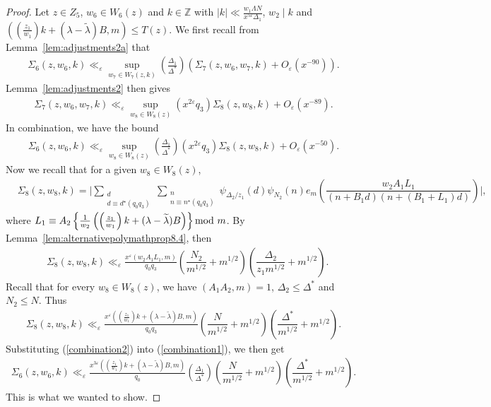 \documentclass{amsart}
\numberwithin{equation}{section}
\begin{document}
\begin{proof} 
Let $z \in Z_5$, $w_6 \in W_6(z)$ and $k \in \mathbb{Z}$ with   $|k| \ll  \frac{w_1\Lambda N}{x^{5\varepsilon}\Delta_1}$,   
 $w_2 \mid k$  and $((\frac{z_1}{w_1})k+(\lambda-\widetilde{\lambda})B,m) \leq T(z)$. We first recall from Lemma~\ref{lem:adjustments2a} that 
\begin{align*}
 \Sigma_6(z,w_6,k) \ll_\varepsilon \sup_{w_7 \in W_7(z,k)} \left( \frac{\Delta_1}{\Delta^*}\right) (\Sigma_7(z,w_6,w_7,k) + O_\varepsilon(x^{-90})).
\end{align*} 
Lemma~\ref{lem:adjustments2} then gives 
 \begin{align*}
 \Sigma_7(z,w_6,w_7, k) \ll_\varepsilon \sup_{w_8 \in W_8(z)} \left( x^{2\varepsilon} q_3 \right) \Sigma_8(z,w_8,k) + O_\varepsilon(x^{-89}).
 \end{align*}
 In combination, we have  the bound
 \begin{align} \label{combination1}
 \Sigma_6(z,w_6,k) \ll_\varepsilon \sup_{w_8 \in W_8(z)} \left( \frac{\Delta_1}{\Delta^*}\right) \left( x^{2\varepsilon} q_3 \right) \Sigma_8(z,w_8,k) + O_\varepsilon(x^{-50}).
\end{align} 
Now we recall that for a given $w_8 \in W_8(z)$, 
 \begin{align*}
&\Sigma_8(z,w_8,k) =  \Bigg| \sum_{\substack{d \\  d \equiv d^\star  (q_0q_3) }} \sum_{\substack{n \\   n \equiv n^\star  (q_0q_3)    }}  \psi_{\Delta_2/z_1}(d)\psi_{N_2}(n)  e_{m}\left(\dfrac{w_2A_1L_1}{( n+B_1 d)(  n+(B_1+L_1)d)}\right)\Bigg|,
\end{align*}  
where $
L_1 \equiv  A_2 \left\{\frac{1}{w_2}\left(\left(\frac{z_1}{w_1}\right)k + (\lambda-\widetilde{\lambda})B\right)\right\} \mbox{\rm mod } m$. By Lemma~\ref{lem:alternativepolymathprop8.4}, then 
\begin{align*}
&\Sigma_8(z,w_8,k) \ll_\varepsilon \frac{x^\varepsilon (w_2A_1 L_1,m) }{q_0q_3}\left(\dfrac{N_2}{m^{1/2}} + m^{1/2} \right)\!\left(\dfrac{\Delta_2}{z_1 m^{1/2} }  + m^{1/2}\right)\!.
\end{align*}
Recall that for every $w_8 \in W_8(z)$, we have $(A_1A_2,m)=1$,  $\Delta_2 \leq \Delta^*$ and $N_2 \leq N$. Thus 
\begin{align} \label{combination2}
\Sigma_8(z,w_8,k) \ll_\varepsilon \frac{x^{\varepsilon} ((\frac{z_1}{w_1})k + (\lambda - \widetilde{\lambda})B,m) }{q_0q_3}\left(\dfrac{N}{m^{1/2}} + m^{1/2} \right)\!\left(\dfrac{\Delta^*}{ m^{1/2} }  + m^{1/2}\right). 
\end{align}
Substituting (\ref{combination2}) into (\ref{combination1}), we then get 
\begin{align*}
\Sigma_6(z,w_6,k) \ll_\varepsilon \frac{x^{3\varepsilon} ((\frac{z_1}{w_1})k + (\lambda - \widetilde{\lambda})B,m) }{q_0}\left(\frac{\Delta_1}{\Delta^*}\right)\left(\dfrac{N}{m^{1/2}} + m^{1/2} \right)\!\left(\dfrac{\Delta^*}{ m^{1/2} }  + m^{1/2}\right). 
\end{align*}
 This is what we wanted to show. 
\end{proof}
\end{document}
